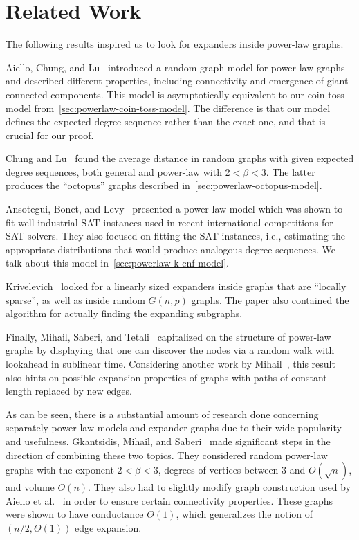 \section{Related Work}

The following results inspired us to look for expanders inside power-law graphs.

Aiello, Chung, and Lu~\cite{acl01} introduced a random graph model for power-law graphs
and described different properties, including connectivity and emergence of giant connected components.
This model is asymptotically equivalent to our coin toss model from~\autoref{sec:powerlaw-coin-toss-model}.
The difference is that our model defines the expected degree sequence
rather than the exact one, and that is crucial for our proof.

Chung and Lu~\cite{cl04} found the average distance in random graphs
with given expected degree sequences, both general and power-law with $2<\beta<3$.
The latter produces the ``octopus'' graphs described in~\autoref{sec:powerlaw-octopus-model}.

Ansotegui, Bonet, and Levy~\cite{abl09} presented a power-law model which was shown to fit well
industrial SAT instances used in recent international competitions for SAT solvers.
They also focused on fitting the SAT instances,
i.e., estimating the appropriate distributions that would produce analogous degree sequences.
We talk about this model in~\autoref{sec:powerlaw-k-cnf-model}.

Krivelevich~\cite{kri17} looked for a linearly sized expanders inside graphs
that are ``locally sparse'', as well as inside random $G(n,p)$ graphs.
The paper also contained the algorithm for actually finding the expanding subgraphs.

Finally, Mihail, Saberi, and Tetali~\cite{mst06} capitalized on the structure of power-law graphs
by displaying that one can discover the nodes via a random walk
with lookahead in sublinear time.
Considering another work by Mihail~\cite{mih89}, this result also hints on possible expansion
properties of graphs with paths of constant length replaced by new edges.

As can be seen, there is a substantial amount of research done concerning separately
power-law models and expander graphs due to their wide popularity and usefulness.
Gkantsidis, Mihail, and Saberi~\cite{gms03} made significant steps
in the direction of combining these two topics.
They considered random power-law graphs with the exponent $2<\beta<3$,
degrees of vertices between $3$ and $O(\sqrt{n})$, and volume $O(n)$.
They also had to slightly modify graph construction used by Aiello et al.~\cite{acl01}
in order to ensure certain connectivity properties.
These graphs were shown to have conductance $\Theta(1)$,
which generalizes the notion of $(n/2,\Theta(1))$ edge expansion.

